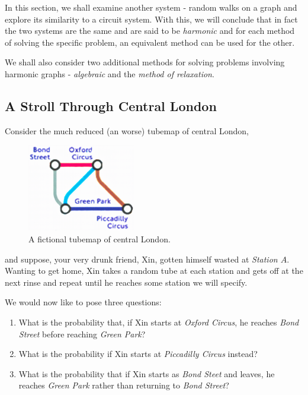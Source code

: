 \documentclass[]{article}
\begin{document}
In this section, we shall examine another system - random walks on a
graph and explore its similarity to a circuit system. With this, we will
conclude that in fact the two systems are the same and are said to be
\emph{harmonic} and for each method of solving the specific problem, an
equivalent method can be used for the other.

We shall also consider two additional methods for solving problems
involving harmonic graphs - \emph{algebraic} and the \emph{method of
relaxation}.

\subsection{A Stroll Through Central
London}\label{a-stroll-through-central-london}

Consider the much reduced (an worse) tubemap of central London,

\begin{figure}
\centering
\includegraphics[height=1.5in]{./walk.png}
\caption{A fictional tubemap of central London.}
\end{figure}

and suppose, your very drunk friend, Xin, gotten himself wasted at
\emph{Station \(A\)}. Wanting to get home, Xin takes a random tube at
each station and gets off at the next rinse and repeat until he reaches
some station we will specify.

We would now like to pose three questions:

\begin{enumerate}
\def\labelenumi{\arabic{enumi}.}
\item
  What is the probability that, if Xin starts at \emph{Oxford Circus},
  he reaches \emph{Bond Street} before reaching \emph{Green Park}?
\item
  What is the probability if Xin starts at \emph{Piccadilly Circus}
  instead?
\item
  What is the probability that if Xin starts as \emph{Bond Steet} and
  leaves, he reaches \emph{Green Park} rather than returning to
  \emph{Bond Street}?
\end{enumerate}
\end{document}
